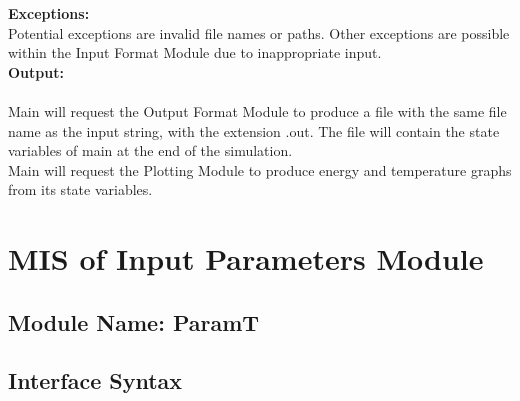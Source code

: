 \documentclass[12pt]{article}
\begin{document}
\noindent \textbf{Exceptions:}\\
Potential exceptions are invalid file names or paths. Other exceptions are
possible within the Input Format Module due to inappropriate input.\\

\noindent \textbf{Output:}\\
\\
Main will request the Output Format Module to produce a file with the  same file
name as the input string, with the extension .out. The file will contain the 
state variables of main at the end of the simulation.\\
Main will request the Plotting Module to produce energy and temperature graphs
from its state variables.


\section{MIS of Input Parameters Module}

\subsection{Module Name: ParamT} %





\subsection{Interface Syntax}
\end{document}

